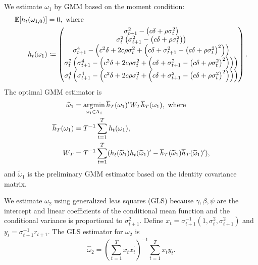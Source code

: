 \documentclass[11pt, letterpaper, twoside]{article}
\begin{document}
We estimate $\omega_{1}$ by GMM based on the moment condition: 
%
\begin{align}
\E[h_{t}(\omega_{1,0})] &= 0, \text{ where} \nonumber \\
%
 h_{t}(\omega_{1}) &\coloneqq  
%
  \begin{pmatrix}
   \sigma_{t+1}^{2}-\left( c\delta +\rho \sigma_{t}^{2}\right) \\ 
%
   \sigma_{t}^{2}\left( \sigma_{t+1}^{2}-\left( c\delta +\rho \sigma _{t}^{2}\right) \right) \\ 
%
   \sigma_{t+1}^{4}-\left( c^{2}\delta +2c\rho \sigma_{t}^{2}+\left( c\delta +\sigma_{t+1}^{2}-\left(
   c\delta +\rho \sigma_{t}^{2}\right) ^{2}\right) \right) \\ 
%
   \sigma_{t}^{2}\left( \sigma_{t+1}^{4}-\left( c^{2}\delta +2c\rho \sigma _{t}^{2}+\left( c\delta +\sigma_{t+1}^{2}-\left( c\delta +\rho \sigma _{t}^{2}\right) ^{2}\right) \right) \right) \\ 
%
   \sigma_{t}^{4}\left( \sigma_{t+1}^{4}-\left( c^{2}\delta +2c\rho \sigma _{t}^{2}+\left( c\delta +\sigma_{t+1}^{2}-\left( c\delta +\rho \sigma _{t}^{2}\right) ^{2}\right) \right) \right) 
  \end{pmatrix}.
\end{align}
%
The optimal GMM estimator is
%
\begin{align}
    \widehat{\omega}_{1} &=  \argmin_{\omega_1 \in \Lambda_{1}}
%
    \overline{h}_{T}(\omega_{1})^{\prime}W_{T}\overline{h}_{T}(\omega_{1}), \text{ where} \nonumber \\ 
%
    \overline{h}_{T}(\omega_{1}) &= T^{-1}\sum_{t = 1}^{T}h_{t}(\omega_{1}), \nonumber \\
%
    W_{T} &= T^{-1}\sum_{t=1}^{T} (h_{t}(\widetilde{\omega}_{1})h_{t}(\widetilde{\omega}_{1})^{\prime }-\overline{h}_{T}(\widetilde{\omega}_{1})\overline{h} _{T}(\widetilde{\omega}_{1})^{\prime}),
\end{align}
%
and $\widetilde{\omega}_{1}$ is the preliminary GMM estimator based on the identity covariance matrix.

We estimate $\omega_{2}$ using generalized leas squares (GLS) because $\gamma, \beta, \psi$ are the intercept and linear coefficients of the conditional mean function and the conditional variance is proportional to $\sigma_{t+1}^{2}$.  Define $x_{t} = \sigma_{t+1}^{-1}(1,\sigma_{t}^{2},\sigma_{t+1}^{2})$ and $y_{t} = \sigma_{t+1}^{-1}r_{t+1}$.  The GLS estimator for $\omega_{2}$ is
%
\begin{equation}
    \widehat{\omega}_{2} = \left( \sum_{t = 1}^{T}x_{t}x_{t}^{\prime}\right) ^{-1}\sum_{t = 1}^{T}x_{t}y_{t}.
\end{equation}
\end{document}
